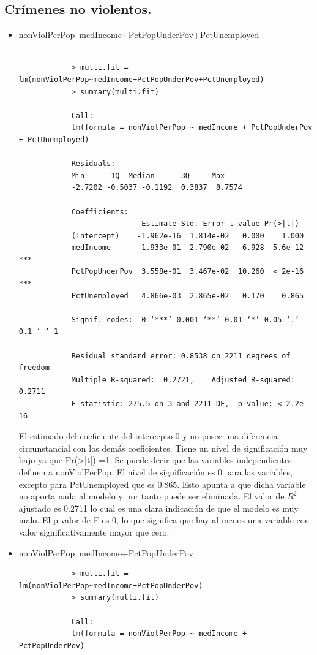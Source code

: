 \documentclass[a4paper,10pt,twocolumn]{article}
\begin{document}
\subsection*{Crímenes no violentos.}
\begin{itemize}
	\item {nonViolPerPop~medIncome+PctPopUnderPov+PctUnemployed}
		\begin{verbatim}
			
			> multi.fit = lm(nonViolPerPop~medIncome+PctPopUnderPov+PctUnemployed)
			> summary(multi.fit)
			
			Call:
			lm(formula = nonViolPerPop ~ medIncome + PctPopUnderPov + PctUnemployed)
			
			Residuals:
			Min      1Q  Median      3Q     Max 
			-2.7202 -0.5037 -0.1192  0.3837  8.7574 
			
			Coefficients:
							Estimate Std. Error t value Pr(>|t|)    
			(Intercept)    -1.962e-16  1.814e-02   0.000    1.000    
			medIncome      -1.933e-01  2.790e-02  -6.928  5.6e-12 ***
			PctPopUnderPov  3.558e-01  3.467e-02  10.260  < 2e-16 ***
			PctUnemployed   4.866e-03  2.865e-02   0.170    0.865    
			---
			Signif. codes:  0 ‘***’ 0.001 ‘**’ 0.01 ‘*’ 0.05 ‘.’ 0.1 ‘ ’ 1
			
			Residual standard error: 0.8538 on 2211 degrees of freedom
			Multiple R-squared:  0.2721,	Adjusted R-squared:  0.2711 
			F-statistic: 275.5 on 3 and 2211 DF,  p-value: < 2.2e-16
		\end{verbatim}

	El estimado del coeficiente del intercepto 0 y no posee una diferencia circunstancial con los demás coeficientes. Tiene un nivel de significación muy bajo ya que Pr(>|t|) =1.
	Se puede decir que las variables independientes definen a nonViolPerPop. El nivel de significación es 0 para las variables, excepto para PctUnemployed que es 0.865. Esto apunta a que dicha variable no aporta nada al modelo y por tanto puede ser eliminada. El valor de $R^2$ ajustado es 0.2711 lo cual es una clara indicación de que el modelo es muy malo. El p-valor de F es 0, lo que significa que hay al menos una variable con valor significativamente mayor que cero.

	\item {nonViolPerPop~medIncome+PctPopUnderPov}

		\begin{verbatim}
			> multi.fit = lm(nonViolPerPop~medIncome+PctPopUnderPov)
			> summary(multi.fit)

			Call:
			lm(formula = nonViolPerPop ~ medIncome + PctPopUnderPov)


\end{verbatim}
\end{itemize}
\end{document}
